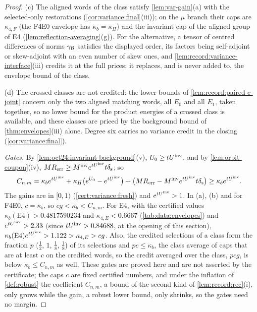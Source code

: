 \begin{proof}
(c) The aligned words of the class satisfy \cref{lem:var-gain}(a) with the selected-only
restorations (\cref{cor:variance:final}(iii)); on the $\mu$ branch their caps are
$\kappa_{4,F}$ (the F4E0 envelope has $\kappa_b=\kappa_H$) and the invariant cap of the
aligned group of E4 (\cref{lem:reflection-averaging}(g)). For the alternative, a
tensor of centred differences of norms $\gamma_\mathcal B$ satisfies the displayed order, its
factors being self-adjoint or skew-adjoint with an even number of skew ones, and
\cref{lem:record:variance-interface}(iii) credits it at the full prices; it replaces,
and is never added to, the envelope bound of the class.

(d) The crossed classes are not credited: the lower bounds of \cref{lem:record:paired-e-joint} concern only the two aligned matching words, all $E_0$ and all $E_1$, taken together, so no lower
bound for the product energies of a crossed class is available, and these
classes are priced by the background bound of \cref{thm:envelopes}(iii) alone.
Degree six carries no variance credit in the closing (\cref{cor:variance:final}).

\emph{Gates.} By \cref{lem:oct24:invariant-background}(v), $U_0\ge tU^{\mathrm{inv}}$, and by
\cref{lem:orbit-coupon}(iv), $MR_{\rm err}\ge M^{\rm inv}e^{tU^{\mathrm{inv}}}t\delta_{\rm s}$; so
\[
 C_{n,m}=\kappa_be^{tU^{\mathrm{inv}}}+\kappa_H\bigl(e^{U_0}-e^{tU^{\mathrm{inv}}}\bigr)
 +\bigl(MR_{\rm err}-M^{\rm inv}e^{tU^{\mathrm{inv}}}t\delta_{\rm s}\bigr)\ge\kappa_be^{tU^{\mathrm{inv}}}.
\]
The gains are in $[0,1)$ (\cref{cert:variance:fresh}) and $e^{tU^{\mathrm{inv}}}>1$. In (a), (b)
and for F4E0, $c=\kappa_b$, so $cg<\kappa_b<C_{n,m}$. For E4,
with the certified values
$\kappa_b(\mathrm{E4})>0.4817590234$ and $\kappa_{4,E}<0.6667$
(\cref{tab:data:envelopes}) and $e^{tU^{\mathrm{inv}}}>2.33$ (since
$tU^{\mathrm{inv}}>0.84688$, at the opening of this section),
$\kappa_b(\mathrm{E4})e^{tU^{\mathrm{inv}}}>1.122>\kappa_{4,E}>cg$. Also, the credited selections of a class form the
fraction $p$ ($\frac12$, $1$, $\frac18$, $\frac18$) of its selections and $pc\le\kappa_b$, the class
average of caps that are at least $c$ on the credited words, so the credit averaged over
the class, $pcg$, is below $\kappa_b\le C_{n,m}$ as well. These gates are proved here and
are not asserted by the certificate; the caps $c$ are fixed certified numbers, and
under the inflation of \cref{def:robust} the coefficient $C_{n,m}$, a bound of the second
kind of \cref{lem:record:rec}(i), only grows while the gain, a robust lower bound, only
shrinks, so the gates need no margin.
\end{proof}

